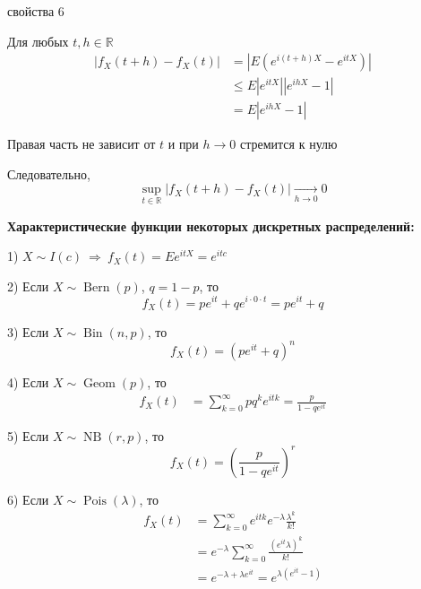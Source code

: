 \documentclass[12pt,a4paper]{article}
\begin{document}
\begin{proofbox}{свойства 6}

Для любых $t,h\in\mathbb{R}$
\[
\begin{aligned}
|f_X(t+h)-f_X(t)|
&=
\left|
E\left(
e^{i(t+h)X}-e^{itX}
\right)
\right|\\
&\leq
E\left|
e^{itX}
\right|
\left|
e^{ihX}-1
\right|\\
&=
E|e^{ihX}-1|
\end{aligned}
\]

Правая часть не зависит от $t$ и при $h\to0$ стремится к нулю

Следовательно,
\[
\sup_{t\in\mathbb{R}}
|f_X(t+h)-f_X(t)|
\xrightarrow[h\to0]{}0
\]

\end{proofbox}

\begin{example}

\textbf{Характеристические функции некоторых дискретных распределений:}

1) $X\sim I(c) \
\Longrightarrow \
f_X(t)=Ee^{itX}=e^{itc}$

\bigskip

2) Если $X\sim\operatorname{Bern}(p)$, $q=1-p$, то
\[
f_X(t)
=
pe^{it}+qe^{i\cdot0\cdot t}
=
pe^{it}+q
\]

\bigskip

3) Если $X\sim\operatorname{Bin}(n,p)$, то
\[
f_X(t)
=
\left(pe^{it}+q\right)^n
\]

\bigskip

4) Если $X\sim\operatorname{Geom}(p)$, то
\[
\begin{aligned}
f_X(t)
&=
\sum_{k=0}^{\infty}pq^ke^{itk}
=
\frac{p}{1-qe^{it}}
\end{aligned}
\]

\bigskip

5) Если $X\sim\operatorname{NB}(r,p)$, то
\[
f_X(t)
=
\left(
\frac{p}{1-qe^{it}}
\right)^r
\]

\bigskip

6) Если $X\sim\operatorname{Pois}(\lambda)$, то
\[
\begin{aligned}
f_X(t)
&=
\sum_{k=0}^{\infty}
e^{itk}e^{-\lambda}\frac{\lambda^k}{k!}\\
&=
e^{-\lambda}
\sum_{k=0}^{\infty}
\frac{(e^{it}\lambda)^k}{k!}\\
&=
e^{-\lambda+\lambda e^{it}}
=
e^{\lambda(e^{it}-1)}
\end{aligned}
\]

\end{example}
\end{document}
